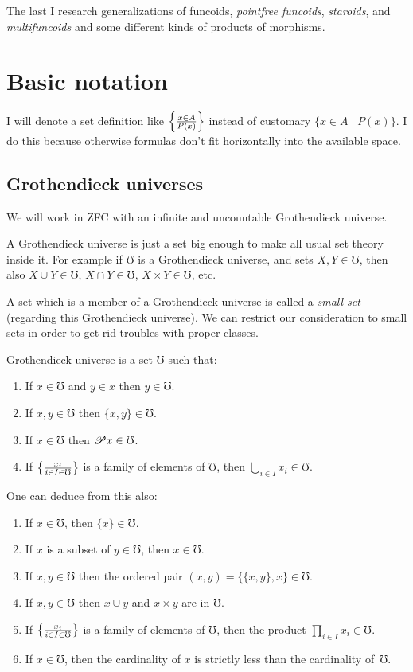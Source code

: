 The last I research generalizations of funcoids, \emph{pointfree funcoids},
\emph{staroids}, and \emph{multifuncoids} and some different kinds
of products of morphisms.


\section{Basic notation}

I will denote a set definition like $\left\{ \frac{x\in A}{P(x)}\right\}$ instead
of customary $\{x\in A\mid P(x)\}$. I do this because otherwise formulas
don't fit horizontally into the available space.


\subsection{Grothendieck universes}

We will work in ZFC with an infinite and uncountable Grothendieck
universe.

A Grothendieck universe is just a set big enough to make all usual
set theory inside it. For example if $\mho$ is a Grothendieck universe,
and sets $X,Y\in\mho$, then also $X\cup Y\in\mho$, $X\cap Y\in\mho$,
$X\times Y\in\mho$, etc.

A set which is a member of a Grothendieck universe
is called a \emph{small set} (regarding this Grothendieck universe).
We can restrict our consideration to small sets in order to get rid
troubles with proper classes.
\begin{defn}
Grothendieck universe is a set $\mho$ such that:
\begin{enumerate}
\item If $x\in\mho$ and $y\in x$ then $y\in\mho$.
\item If $x,y\in\mho$ then $\{x,y\}\in\mho$.
\item If $x\in\mho$ then $\mathscr{P} x\in\mho$.
\item If $\left\{ \frac{x_{i}}{i\in I\in\mho}\right\}$ is a family of elements of $\mho$,
then $\bigcup_{i\in I}x_{i}\in\mho$.
\end{enumerate}
\end{defn}
One can deduce from this also:
\begin{enumerate}
\item If $x\in\mho$, then $\{x\}\in\mho$.
\item If $x$ is a subset of $y\in\mho$, then $x\in\mho$.
\item If $x,y\in\mho$ then the ordered pair $(x,y)=\{\{x,y\},x\}\in\mho$.
\item If $x,y\in\mho$ then $x\cup y$ and $x\times y$ are in $\mho$.
\item If $\left\{ \frac{x_{i}}{i\in I\in\mho}\right\}$ is a family of elements of $\mho$,
then the product $\prod_{i\in I}x_{i}\in\mho$.
\item If $x\in\mho$, then the cardinality of $x$ is strictly less than
the cardinality of~$\mho$.
\end{enumerate}

